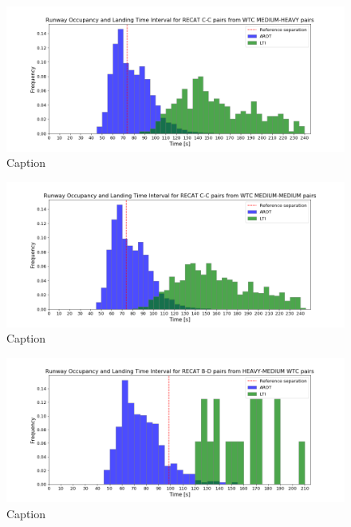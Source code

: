 \begin{figure}[h]
    \centering
    \includegraphics[width=1\textwidth]{graphics/fig_CC_from_MH_pairs_time_sep.png}
    \caption[list of figures caption]{Caption}
    \label{fig:CC_from_MH_pairs_time_sep}
\end{figure}

\begin{figure}[h]
    \centering
    \includegraphics[width=1\textwidth]{graphics/fig_CC_from_MM_pairs_time_sep.png}
    \caption[list of figures caption]{Caption}
    \label{fig:CC_from_MM_pairs_time_sep}
\end{figure}

\begin{figure}[h]
    \centering
    \includegraphics[width=1\textwidth]{graphics/fig_BD_from_HM_pairs_time_sep.png}
    \caption[list of figures caption]{Caption}
    \label{fig:BD_from_HM_pairs_time_sep}
\end{figure}








